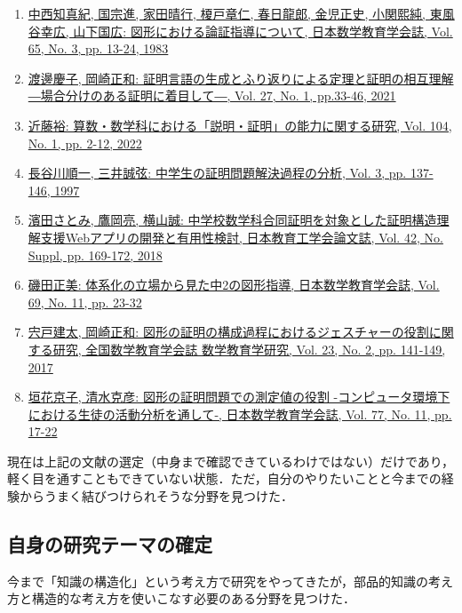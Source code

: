 \documentclass[a4paper,12pt]{ltjsarticle}
\begin{document}
\begin{enumerate}
  \item \href{https://www.jstage.jst.go.jp/article/jjsme/65/3/65_13/_pdf/-char/ja}{中西知真紀, 国宗進, 家田晴行, 榎戸章仁, 春日龍郎, 金児正史, 小関熙純, 東風谷幸広, 山下国広: 図形における論証指導について, 日本数学教育学会誌, Vol. 65, No. 3, pp. 13-24, 1983}
  \item \href{https://www.jstage.jst.go.jp/article/jasme/27/1/27_33/_pdf/-char/ja}{渡邊慶子, 岡崎正和: 証明言語の生成とふり返りによる定理と証明の相互理解 ―場合分けのある証明に着目して―, Vol. 27, No. 1, pp.33-46, 2021}
  \item \href{https://www.jstage.jst.go.jp/article/jjsme/104/1/104_2/_pdf/-char/ja}{近藤裕: 算数・数学科における「説明・証明」の能力に関する研究, Vol. 104, No. 1, pp. 2-12, 2022}
  \item \href{https://www.jstage.jst.go.jp/article/jasme/3/0/3_KJ00008199223/_pdf/-char/ja}{長谷川順一, 三井誠弦: 中学生の証明問題解決過程の分析, Vol. 3, pp. 137-146, 1997}
  \item \href{https://www.jstage.jst.go.jp/article/jjet/42/Suppl./42_S42092/_pdf/-char/ja}{濱田さとみ, 鷹岡亮, 横山誠: 中学校数学科合同証明を対象とした証明構造理解支援Webアプリの開発と有用性検討, 日本教育工学会論文誌, Vol. 42, No. Suppl, pp. 169-172, 2018}
  \item \href{https://www.jstage.jst.go.jp/article/jjsme/69/11/69_23/_pdf/-char/en}{磯田正美: 体系化の立場から見た中2の図形指導, 日本数学教育学会誌, Vol. 69, No. 11, pp. 23-32}
  \item \href{https://www.jstage.jst.go.jp/article/jasme/23/2/23_141/_pdf/-char/ja}{宍戸建太, 岡崎正和: 図形の証明の構成過程におけるジェスチャーの役割に関する研究, 全国数学教育学会誌 数学教育学研究, Vol. 23, No. 2, pp. 141-149, 2017}
  \item \href{https://www.jstage.jst.go.jp/article/jjsme/77/11/77_17/_pdf/-char/ja}{垣花京子, 清水克彦: 図形の証明問題での測定値の役割 -コンピュータ環境下における生徒の活動分析を通して-, 日本数学教育学会誌, Vol. 77, No. 11, pp. 17-22}
\end{enumerate}

現在は上記の文献の選定（中身まで確認できているわけではない）だけであり，軽く目を通すこともできていない状態．ただ，自分のやりたいことと今までの経験からうまく結びつけられそうな分野を見つけた．

\subsection{自身の研究テーマの確定}
今まで「知識の構造化」という考え方で研究をやってきたが，部品的知識の考え方と構造的な考え方を使いこなす必要のある分野を見つけた．\\
\end{document}
